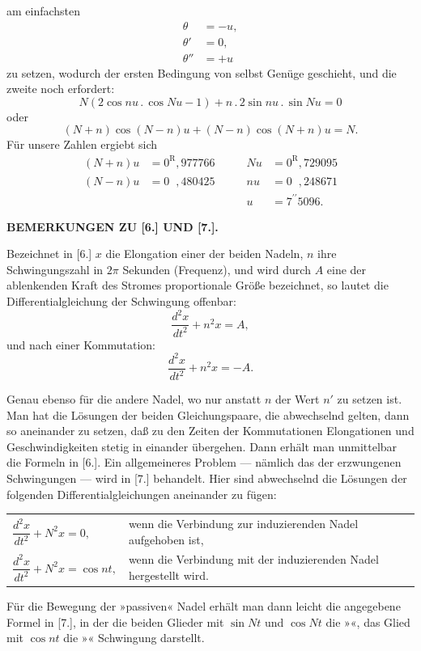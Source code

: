 am einfachsten
\[
\begin{aligned}
\theta&=-u,\\
\theta'&=0,\\
\theta''&=+u
\end{aligned}
\]
\noindent zu setzen, wodurch der ersten Bedingung von selbst Genüge geschieht, und
die zweite noch erfordert:
\[
N(2\cos nu\mathpunct{.}\cos Nu-1)+n\mathpunct{.}2\sin nu\mathpunct{.}\sin Nu=0
\]
\noindent oder
\[
(N+n)\cos(N-n)u+(N-n)\cos(N+n)u=N.
\]
\noindent Für unsere Zahlen ergiebt sich
\[
\begin{alignedat}{2}
(N+n)u&=0^{\mathrm R}{,}977766\qquad&Nu&=0^{\mathrm R}{,}729095\\
(N-n)u&=0^{\phantom{\mathrm R}}{,}480425&nu&=0^{\phantom{\mathrm R}}{,}248671\\
&&u&=7^{\prime\prime}5096.
\end{alignedat}
\]
\bigskip\begin{center}\textbf{BEMERKUNGEN ZU [6.] UND [7.].}\end{center}
\begingroup\small
\indent Bezeichnet in [6.] \(x\) die Elongation einer der beiden Nadeln, \(n\) ihre Schwingungszahl in \(2\pi\) Sekunden
(Frequenz), und wird durch \(A\) eine der ablenkenden Kraft des Stromes proportionale Größe bezeichnet, so
lautet die Differentialgleichung der Schwingung offenbar:
\[
\frac{d^2x}{dt^2}+n^2x=A,
\]
\noindent und nach einer Kommutation:
\[
\frac{d^2x}{dt^2}+n^2x=-A.
\]

Genau ebenso für die andere Nadel, wo nur anstatt \(n\) der Wert \(n'\) zu setzen ist. Man hat die Lösungen
der beiden Gleichungspaare, die abwechselnd gelten, dann so aneinander zu setzen, daß zu den
Zeiten der Kommutationen Elongationen und Geschwindigkeiten stetig in einander übergehen. Dann erhält
man unmittelbar die Formeln in [6.].
\clearpage{}
\indent Ein allgemeineres Problem — nämlich das der erzwungenen Schwingungen — wird in [7.] behandelt.
Hier sind abwechselnd die Lösungen der folgenden Differentialgleichungen aneinander zu fügen:
\begin{center}
\begin{tabular}{@{}l@{\quad}p{.64\linewidth}@{}}
\(\dfrac{d^2x}{dt^2}+N^2x=0,\)&wenn die Verbindung zur induzierenden Nadel aufgehoben ist,\\[1.2ex]
\(\dfrac{d^2x}{dt^2}+N^2x=\cos nt,\)&wenn die Verbindung mit der induzierenden Nadel hergestellt wird.
\end{tabular}
\end{center}
\noindent Für die Bewegung der »passiven« Nadel erhält man dann leicht die angegebene Formel in [7.], in der die
beiden Glieder mit \(\sin Nt\) und \(\cos Nt\) die »«, das Glied mit \(\cos nt\) die »«
Schwingung darstellt.

